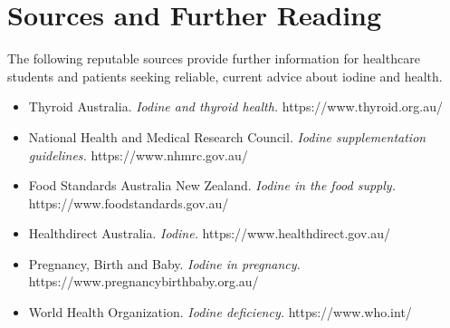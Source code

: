 \section*{Sources and Further Reading}
The following reputable sources provide further information for healthcare students and patients seeking reliable, current advice about iodine and health.
\begin{itemize}
    \item Thyroid Australia. \textit{Iodine and thyroid health.} https://www.thyroid.org.au/
    \item National Health and Medical Research Council. \textit{Iodine supplementation guidelines.} https://www.nhmrc.gov.au/
    \item Food Standards Australia New Zealand. \textit{Iodine in the food supply.} https://www.foodstandards.gov.au/
    \item Healthdirect Australia. \textit{Iodine.} https://www.healthdirect.gov.au/
    \item Pregnancy, Birth and Baby. \textit{Iodine in pregnancy.} https://www.pregnancybirthbaby.org.au/
    \item World Health Organization. \textit{Iodine deficiency.} https://www.who.int/
\end{itemize}
